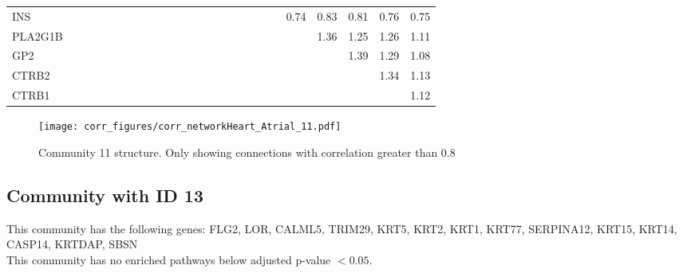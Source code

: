 \begin{longtable}{lrrrrrrrrrrrrrrrrrrrrrrrr}
INS      &              &              &              &              &             &             &             &             &            &              &            &            &            &             &             &           &             &                &           &          0.74 &      0.83 &        0.81 &        0.76 &       0.75 \\
PLA2G1B  &              &              &              &              &             &             &             &             &            &              &            &            &            &             &             &           &             &                &           &               &      1.36 &        1.25 &        1.26 &       1.11 \\
GP2      &              &              &              &              &             &             &             &             &            &              &            &            &            &             &             &           &             &                &           &               &           &        1.39 &        1.29 &       1.08 \\
CTRB2    &              &              &              &              &             &             &             &             &            &              &            &            &            &             &             &           &             &                &           &               &           &             &        1.34 &       1.13 \\
CTRB1    &              &              &              &              &             &             &             &             &            &              &            &            &            &             &             &           &             &                &           &               &           &             &             &       1.12 \\
\end{longtable}


\begin{figure}[h!]
\centering
\texttt{[image: corr\_figures/corr\_networkHeart\_Atrial\_11.pdf]}
\caption{Community 11 structure. Only showing connections with correlation greater than 0.8}
\end{figure}




\subsection*{Community with ID 13}
This community has the following genes: FLG2, LOR, CALML5, TRIM29, KRT5, KRT2, KRT1, KRT77, SERPINA12, KRT15, KRT14, CASP14, KRTDAP, SBSN
\\
This community has no enriched pathways below adjusted p-value $< 0.05$.

